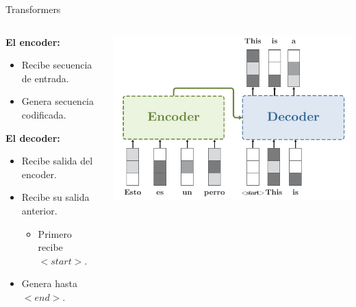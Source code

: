 \documentclass[aspectratio=169]{beamer}
\begin{document}
\begin{frame}{Transformers}
  \begin{columns}
    \begin{column}{.4\textwidth}
      \textbf{El encoder:}
      \begin{itemize}
        \item Recibe secuencia de entrada.
        \item Genera secuencia codificada.
      \end{itemize}
      \vspace{.5cm}
      \textbf{El decoder:}
      \begin{itemize}
        \item Recibe salida del encoder.
        \item Recibe su salida anterior.
        \begin{itemize}
          \item Primero recibe \emph{$<start>$}.
        \end{itemize}
        \item Genera hasta \emph{$<end>$}.
      \end{itemize}
    \end{column}
    \begin{column}{.6\textwidth}
      \includegraphics[width=\textwidth, center]{imgs/tema4/att/Transformer_all_s3.pdf}
    \end{column}
  \end{columns}
\end{frame}
\end{document}

